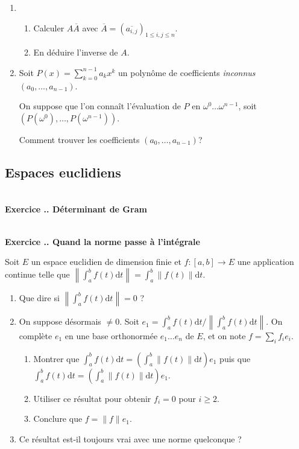 \documentclass{article}
\newcommand{\di}{\mathrm{d}}
\newcounter{exo}
\newcommand{\exercice}[1][\null]{\textbf{\\ Exercice \thesection.\theexo. #1} \addtocounter{exo}{1}}
\begin{document}
\begin{enumerate}

\item \begin{enumerate}

\item Calculer $A \overline{A}$ avec $\overline{A} = (\overline{a_{i,j}})_{1 \le i,j \le n}$.

\item En déduire l'inverse de $A$.

\end{enumerate}

\item Soit $ P(x) =  \sum_{k=0}^{n-1} a_k x^k$ un polynôme de coefficients \emph{inconnus} $(a_0, \dots, a_{n-1})$.

On suppose que l'on connaît l'évaluation de $P$ en $\omega^0 \dots \omega^{n-1}$, soit $(P(\omega^0), \dots, P(\omega^{n-1}))$.

Comment trouver les coefficients $(a_0, \dots, a_{n-1})$?

\end{enumerate}

\subsection{Espaces euclidiens}

\exercice[Déterminant de Gram]

\exercice[Quand la norme passe à l'intégrale]

Soit $E$ un espace euclidien de dimension finie et $f : [a,b] \rightarrow E$ une application continue telle que $\displaystyle \left\lVert\int_a^b f(t) \di t \right\lVert = \int_a^b \lVert f(t)\lVert \di t$.

\begin{enumerate}

\item Que dire si $\left\lVert\int_a^b f(t) \di t \right\lVert = 0$ ?

\item On suppose désormais $\neq 0$. Soit $e_1 = \int_a^b f(t) \di t \Big/  \left\lVert\int_a^b f(t) \di t \right\lVert $. On complète $e_1$ en une base orthonormée $e_1 \dots e_n$ de $E$, et on note $f = \sum_i f_i e_i$.
\begin{enumerate}

\item Montrer que $\int_a^b f(t) \di t = (\int_a^b \lVert f(t) \rVert \di t) e_1$ puis que $\int_a^b f(t) \di t = (\int_a^b \lVert f(t) \rVert \di t) e_1$.

\item Utiliser ce résultat pour obtenir $f_i = 0$ pour $i \ge 2$.

\item Conclure que $f = \lVert f \lVert e_1$.

\end{enumerate}

\item Ce résultat est-il toujours vrai avec une norme quelconque ?

\end{enumerate}
\end{document}
